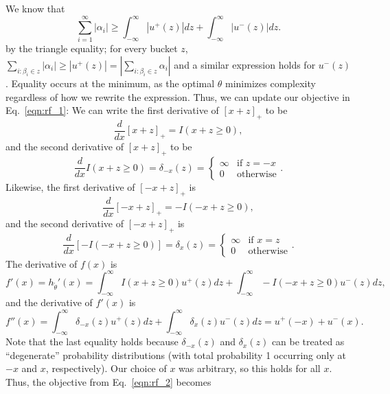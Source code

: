  We know that
\[
\sum_{i=1}^\infty |\alpha_i| \ge \int_{-\infty}^{\infty} |u^+(z)| dz + \int_{-\infty}^{\infty} |u^-(z)| dz.
\]
by the triangle equality; for every bucket $z$, $\sum_{i: \beta_i \in z} |\alpha_i| \ge |u^+(z)| = |\sum_{i: \beta_i \in z} \alpha_i|$ and a similar expression holds for $u^-(z)$. Equality occurs at the minimum, as the optimal $\theta$ minimizes complexity regardless of how we rewrite the expression. Thus, we can update our objective in Eq.~\eqref{eqn:rf_1}:
We can write the first derivative of $[x+z]_+$ to be
\[
\frac{d}{dx} [x+z]_+ = I(x+z \ge 0),
\]
and the second derivative of $[x+z]_+$ to be
\[
\frac{d}{dx} I(x+z \ge 0) = \delta_{-x}(z) = 
\begin{cases}
\infty & \text{if } z=-x \\
0 & \text{otherwise}
\end{cases}.
\]
Likewise, the first derivative of $[-x+z]_+$ is
\[
\frac{d}{dx} [-x+z]_+ = -I(-x+z \ge 0),
\]
and the second derivative of $[-x+z]_+$ is
\[
\frac{d}{dx} [-I(-x+z \ge 0)] = \delta_{x}(z) = 
\begin{cases}
\infty & \text{if } x=z \\
0 & \text{otherwise}
\end{cases}.
\]
The derivative of $f(x)$ is
\[
f'(x) = h_{\widetilde\theta}'(x) = \int_{-\infty}^{\infty} I(x+z \ge 0) u^+(z) dz + \int_{-\infty}^{\infty} -I(-x+z \ge 0) u^-(z) dz,
\]
and the derivative of $f'(x)$ is
\[
f''(x) = \int_{-\infty}^\infty \delta_{-x}(z) u^+(z) dz + \int_{-\infty}^\infty \delta_{x}(z) u^-(z) dz = u^+(-x) + u^-(x).
\]
Note that the last equality holds because $\delta_{-x}(z)$ and $\delta_{x}(z)$ can be treated as ``degenerate'' probability distributions (with total probability 1 occurring only at $-x$ and $x$, respectively). Our choice of $x$ was arbitrary, so this holds for all $x$. Thus, the objective from Eq.~\eqref{eqn:rf_2} becomes

